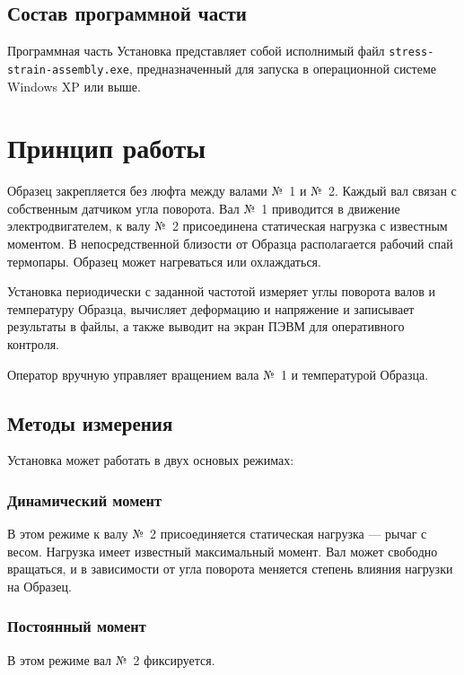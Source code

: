 \documentclass[12pt, a4paper, twocolumn]{report}
\begin{document}
\subsection{Состав программной части}
\label{sec_software}

Программная часть Установка представляет собой исполнимый файл {\tt stress-strain-assembly.exe}, предназначенный для запуска в операционной системе Windows XP или выше.

\section{Принцип работы}

Образец закрепляется без люфта между валами №~1 и №~2. Каждый вал связан с собственным датчиком угла поворота. Вал №~1 приводится в движение электродвигателем, к валу №~2 присоединена статическая нагрузка с известным моментом. В непосредственной близости от Образца располагается рабочий спай термопары. Образец может нагреваться или охлаждаться.

Установка периодически с заданной частотой измеряет углы поворота валов и температуру Образца, вычисляет деформацию и напряжение и записывает результаты в файлы, а также выводит на экран ПЭВМ для оперативного контроля.

Оператор вручную управляет вращением вала №~1 и температурой Образца.

\subsection{Методы измерения}
\label{sec_measurement_method}

Установка может работать в двух основых режимах:

\subsubsection{Динамический момент}

В этом режиме к валу №~2 присоединяется статическая нагрузка --- рычаг с весом. Нагрузка имеет известный максимальный момент. Вал может свободно вращаться, и в зависимости от угла поворота меняется степень влияния нагрузки на Образец.

\subsubsection{Постоянный момент}
\label{sec_const_momentum}

В этом режиме вал №~2 фиксируется.
\end{document}
